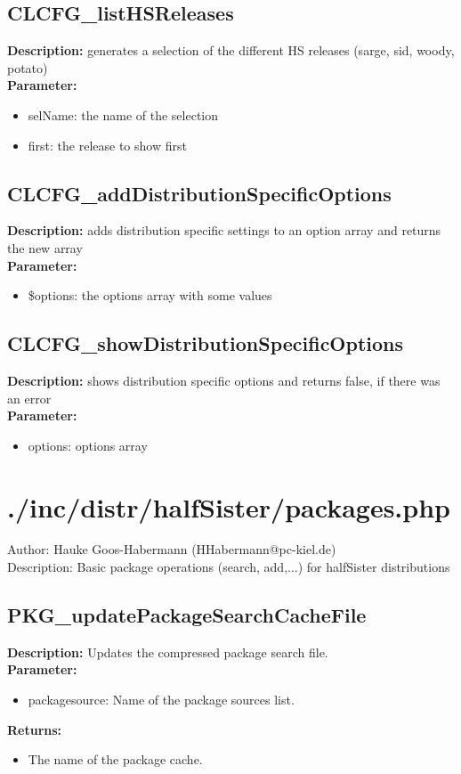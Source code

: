 \subsection{CLCFG\_listHSReleases}
\textbf{Description:} generates a selection of the different HS releases (sarge, sid, woody, potato)\\
\textbf{Parameter:}
\begin{itemize}
\item selName: the name of the selection
\item first: the release to show first
\end{itemize}

\subsection{CLCFG\_addDistributionSpecificOptions}
\textbf{Description:} adds distribution specific settings to an option array and returns the new array\\
\textbf{Parameter:}
\begin{itemize}
\item \$options: the options array with some values
\end{itemize}

\subsection{CLCFG\_showDistributionSpecificOptions}
\textbf{Description:} shows distribution specific options and returns false, if there was an error\\
\textbf{Parameter:}
\begin{itemize}
\item options: options array
\end{itemize}

\newpage\section{./inc/distr/halfSister/packages.php}
Author: Hauke Goos-Habermann (HHabermann@pc-kiel.de)\\
Description: Basic package operations (search, add,...) for halfSister distributions\\

\subsection{PKG\_updatePackageSearchCacheFile}
\textbf{Description:} Updates the compressed package search file.\\
\textbf{Parameter:}
\begin{itemize}
\item packagesource: Name of the package sources list.
\end{itemize}
\textbf{Returns:}
\begin{itemize}
\item The name of the package cache.
\end{itemize}

